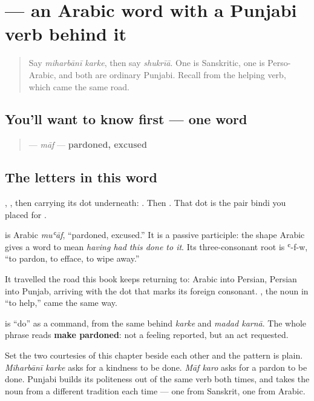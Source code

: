 \section[\texorpdfstring{\pa{ਮਾਫ਼} \pa{ਕਰੋ} (māf karo)}{ਮਾਫ਼ ਕਰੋ (māf karo)}]{  — an Arabic word with a Punjabi verb behind it}

\label{lesson:PA-C33-maaf-karo}



\begin{quote}
Say \emph{miharbānī karke}, then say \emph{shukrīā}. One is Sanskritic, one is Perso-Arabic, and both are ordinary Punjabi. Recall \textbf{} from the helping verb, which came the same road.
\end{quote}

\subsection*{You'll want to know first — one word}
\begin{quote}
\textbf{} — \emph{māf} — \textbf{pardoned, excused}
\end{quote}

\subsection*{The letters in this word}
\textbf{}, \textbf{}, then \textbf{} carrying its dot underneath: \textbf{}. Then \textbf{}. That dot is the pair bindi you placed for \textbf{}.

\begin{cousinweb}
\textbf{} is Arabic \emph{muʿāf}, \textquotedblleft{}pardoned, excused.\textquotedblright{} It is a passive participle: the shape Arabic gives a word to mean \emph{having had this done to it}. Its three-consonant root is ʿ-f-w, \textquotedblleft{}to pardon, to efface, to wipe away.\textquotedblright{}

It travelled the road this book keeps returning to: Arabic into Persian, Persian into Punjab, arriving with the dot that marks its foreign consonant. \textbf{}, the noun in \textquotedblleft{}to help,\textquotedblright{} came the same way.

\textbf{} is \textquotedblleft{}do\textquotedblright{} as a command, from the same \textbf{} behind \emph{karke} and \emph{madad karnā}. The whole phrase reads \textbf{make pardoned}: not a feeling reported, but an act requested.

Set the two courtesies of this chapter beside each other and the pattern is plain. \emph{Miharbānī karke} asks for a kindness to be done. \emph{Māf karo} asks for a pardon to be done. Punjabi builds its politeness out of the same verb both times, and takes the noun from a different tradition each time — one from Sanskrit, one from Arabic.
\end{cousinweb}

